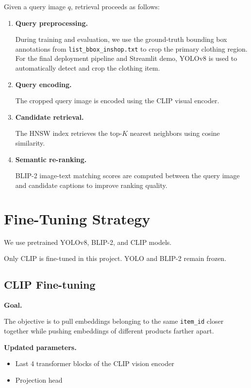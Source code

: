 \documentclass[12pt,a4paper]{article}
\begin{document}
Given a query image $q$, retrieval proceeds as follows:

\begin{enumerate}[noitemsep]
    \item \textbf{Query preprocessing.}

    During training and evaluation, we use the ground-truth bounding box annotations
from \texttt{list\_bbox\_inshop.txt} to crop the primary clothing region. For the final
deployment pipeline and Streamlit demo, YOLOv8 is used to automatically detect
and crop the clothing item.

    \item \textbf{Query encoding.}

    The cropped query image is encoded using the CLIP visual encoder.

    \item \textbf{Candidate retrieval.}

    The HNSW index retrieves the top-$K$ nearest neighbors using cosine
    similarity.

    \item \textbf{Semantic re-ranking.}

    BLIP-2 image-text matching scores are computed between the query image
    and candidate captions to improve ranking quality.
\end{enumerate}

\section{Fine-Tuning Strategy}

We use pretrained YOLOv8, BLIP-2, and CLIP models.

Only CLIP is fine-tuned in this project. YOLO and BLIP-2 remain frozen.

\subsection{CLIP Fine-tuning}

\textbf{Goal.}

The objective is to pull embeddings belonging to the same
\texttt{item\_id} closer together while pushing embeddings of different
products farther apart.

\textbf{Updated parameters.}

\begin{itemize}[noitemsep]
    \item Last 4 transformer blocks of the CLIP vision encoder
    \item Projection head
\end{itemize}
\end{document}
